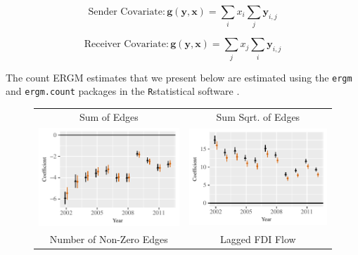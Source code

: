 \documentclass{article}
\newcommand{\R}{\texttt{R}} %
\begin{document}
$$ \text{Sender Covariate}: \bm{g(y,x)} = \sum_{i}x_i \sum_{j} \bm{y}_{i,j}$$

$$ \text{Receiver Covariate}: \bm{g(y,x)} = \sum_{j}x_j \sum_{i} \bm{y}_{i,j}$$

\noindent The count ERGM estimates that we present below are estimated using the \texttt{ergm} \citep{ergm} and \texttt{ergm.count} \citep{ergmcount} packages in the \R \space statistical software \citep{r}.




\begin{figure}[htp]
\centering
\begin{tabular}{c@{\hskip -.4cm}c}
Sum of Edges&
Sum Sqrt. of Edges\\
\includegraphics[height=.22\textheight, clip=true, trim=0cm .5cm 0cm .1cm]{draft_figures/rl_plots/Sum.pdf}    &
\includegraphics[height=.22\textheight, clip=true, trim=.5cm .5cm 0cm .1cm]{draft_figures/rl_plots/Sum_5.pdf}   \\
Number of Non-Zero Edges &
Lagged FDI Flow\\

\end{tabular}
\end{figure}
\end{document}
